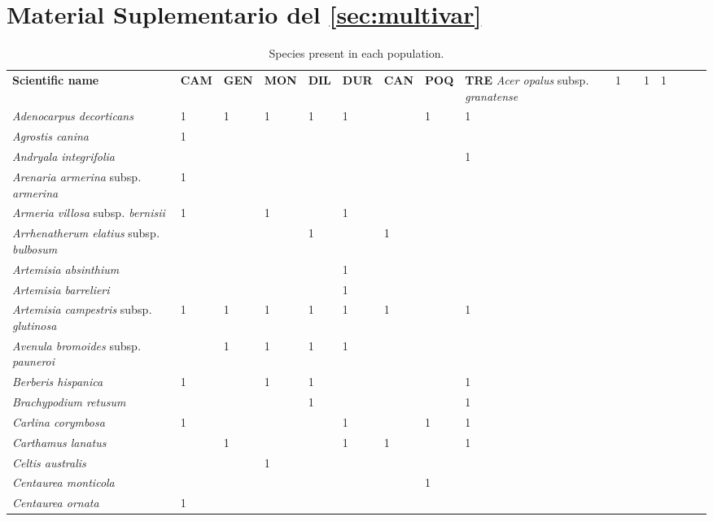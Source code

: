 %
\chapter{Material Suplementario del  \autoref{sec:multivar}}\label{sec:appendix:multivar}

{%
\scriptsize
\begin{longtable}{llllllllll}
\caption{Species present in each population.}\label{tab:multivar-s1}\\ 
\toprule
 \textbf{Scientific name}  & \textbf{CAM}  & \textbf{GEN}  & \textbf{MON}  & \textbf{DIL}  & \textbf{DUR}  & \textbf{CAN}  & \textbf{POQ}  & \textbf{TRE}  \endfirsthead 
\hline
\textit{Acer opalus }subsp\textit{. granatense}  & 1 &  & 1 & 1 &  &  &  &  \\
\textit{Adenocarpus decorticans}  & 1 & 1 & 1 & 1 & 1 &  & 1 & 1 \\
\textit{Agrostis canina}  & 1 &  &  &  &  &  &  &  \\
\textit{Andryala integrifolia}  &  &  &  &  &  &  &  & 1 \\
\textit{Arenaria armerina }subsp\textit{. armerina}  & 1 &  &  &  &  &  &  &  \\
\textit{Armeria villosa }subsp\textit{. bernisii}  & 1 &  & 1 &  & 1 &  &  &  \\
\textit{Arrhenatherum elatius }subsp\textit{. bulbosum}  &  &  &  & 1 &  & 1 &  &  \\
\textit{Artemisia absinthium}  &  &  &  &  & 1 &  &  &  \\
\textit{Artemisia barrelieri}  &  &  &  &  & 1 &  &  &  \\
\textit{Artemisia campestris }subsp\textit{. glutinosa}  & 1 & 1 & 1 & 1 & 1 & 1 &  & 1 \\
\textit{Avenula bromoides }subsp\textit{. pauneroi}  &  & 1 & 1 & 1 & 1 &  &  &  \\
\textit{Berberis hispanica}  & 1 &  & 1 & 1 &  &  &  & 1 \\
\textit{Brachypodium retusum}  &  &  &  & 1 &  &  &  & 1 \\
\textit{Carlina corymbosa}  & 1 &  &  &  & 1 &  & 1 & 1 \\
\textit{Carthamus lanatus}  &  & 1 &  &  & 1 & 1 &  & 1 \\
\textit{Celtis australis}  &  &  & 1 &  &  &  &  &  \\
\textit{Centaurea monticola}  &  &  &  &  &  &  & 1 &  \\
\textit{Centaurea ornata}  & 1 &  &  &  &  &  &  &  \\

\end{longtable}}
